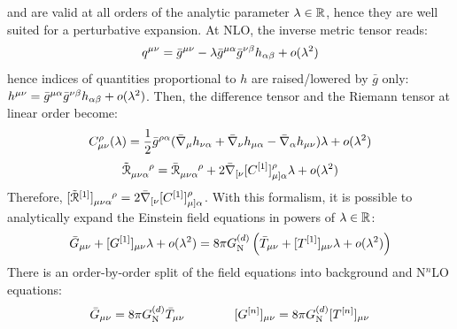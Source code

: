  and  are valid at all orders of the analytic parameter $ \lambda \in \mathbb{R} $, hence they are well suited for a perturbative expansion. At NLO, the inverse metric tensor reads:
\begin{equation}
  q^{\mu \nu} = \bar{g}^{\mu \nu} - \lambda \bar{g}^{\mu \alpha} \bar{g}^{\nu \beta} h_{\alpha \beta} + o(\lambda^2)
\end{equation}
hence indices of quantities proportional to $ h $ are raised/lowered by $ \bar{g} $ only: $ h^{\mu \nu} = \bar{g}^{\mu \alpha} \bar{g}^{\nu \beta} h_{\alpha \beta} + o(\lambda^2) $.
Then, the difference tensor and the Riemann tensor at linear order become:
\begin{equation}
  C^\rho_{\mu \nu}(\lambda) = \frac{1}{2} \bar{g}^{\rho \alpha} ( \bar{\nabla}_\mu h_{\nu \alpha} + \bar{\nabla}_\nu h_{\mu \alpha} - \bar{\nabla}_\alpha h_{\mu \nu} ) \lambda + o(\lambda^2)
\end{equation}
\begin{equation}
  \tensor{\tilde{\rr}}{_{\mu \nu \alpha}^\rho} = \tensor{\bar{\rr}}{_{\mu \nu \alpha}^\rho} + 2 \bar{\na}_{[\nu} [C\od1]^\rho_{\mu]\alpha} \lambda + \smo(\lambda^2)
\end{equation}
Therefore, $ \tensor{[\tilde{\rr}\od1]}{_{\mu \nu \alpha}^\rho} = 2 \bar{\na}_{[\nu} [C\od1]^\rho_{\mu]\alpha} $. With this formalism, it is possible to analytically expand the Einstein field equations in powers of $ \lambda \in \mathbb{R} $:
\begin{equation*}
  \bar{G}_{\mu \nu} + [G^{[1]}]_{\mu \nu} \lambda + o(\lambda^2) = 8 \pi G_\text{N}^{(d)} \left( \bar{T}_{\mu \nu} + [T^{[1]}]_{\mu \nu} \lambda + o(\lambda^2) \right)
\end{equation*}
There is an order-by-order split of the field equations into background and N$ ^n $LO equations:
\begin{equation}
  \bar{G}_{\mu \nu} = 8 \pi G_\text{N}^{(d)} \bar{T}_{\mu \nu}
  \qquad \qquad
  [G^{[n]}]_{\mu \nu} = 8 \pi G_\text{N}^{(d)} [T^{[n]}]_{\mu \nu}
  \label{eq:perturbation-einstein}
\end{equation}

